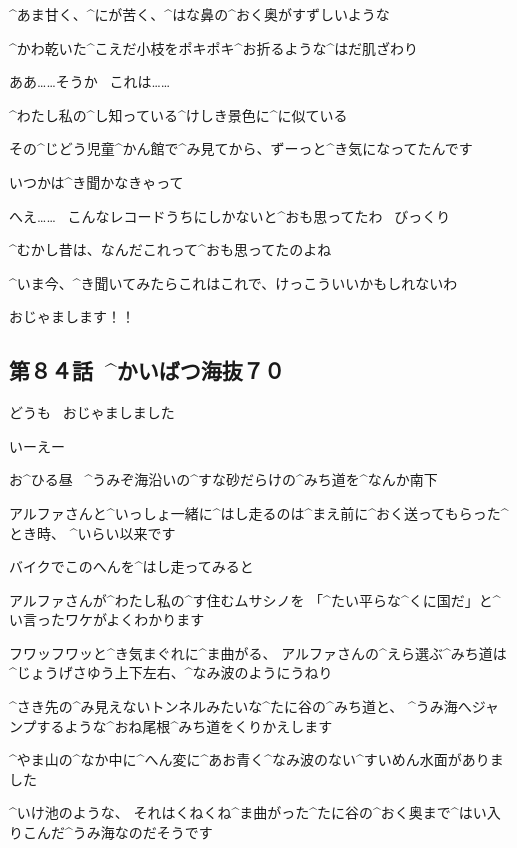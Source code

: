 \Kokone ^{あま}{甘}く、^{にが}{苦}く、^{はな}{鼻}の^{おく}{奥}がすずしいような

\Kokone ^{かわ}{乾}いた^{こえだ}{小枝}をポキポキ^{お}{折}るような^{はだ}{肌}ざわり

\Kokone ああ……そうか
\ これは……

\Kokone ^{わたし}{私}の^{し}{知}っている^{けしき}{景色}に^{に}{似}ている

\page[93]
\Kokone その^{じどう}{児童}^{かん}{館}で^{み}{見}てから、ずーっと^{き}{気}になってたんです

\Kokone いつかは^{き}{聞}かなきゃって

\Sensei へえ……
\ こんなレコードうちにしかないと^{おも}{思}ってたわ
\ びっくり

\Sensei ^{むかし}{昔}は、なんだこれって^{おも}{思}ってたのよね

\Sensei ^{いま}{今}、^{き}{聞}いてみたらこれはこれで、けっこういいかもしれないわ

\page
\Alpha おじゃまします！！


\subsection{第８４話\ ^{かいばつ}{海抜}７０}

\page[96]
\Kokone どうも
\ おじゃましました

\Sensei いーえー

\page
\Kokone お^{ひる}{昼}
\ ^{うみぞ}{海沿}いの^{すな}{砂}だらけの^{みち}{道}を^{なんか}{南下}

\Kokone アルファさんと^{いっしょ}{一緒}に^{はし}{走}るのは^{まえ}{前}に^{おく}{送}ってもらった^{とき}{時}、
^{いらい}{以来}です

\page
\Kokone バイクでこのへんを^{はし}{走}ってみると

\Kokone アルファさんが^{わたし}{私}の^{す}{住}むムサシノを
「^{たい}{平}らな^{くに}{国}だ」と^{い}{言}ったワケがよくわかります

\page
\Kokone フワッフワッと^{き}{気}まぐれに^{ま}{曲}がる、
アルファさんの^{えら}{選}ぶ^{みち}{道}は^{じょうげさゆう}{上下左右}、^{なみ}{波}のようにうねり

\Kokone ^{さき}{先}の^{み}{見}えないトンネルみたいな^{たに}{谷}の^{みち}{道}と、
^{うみ}{海}へジャンプするような^{おね}{尾根}^{みち}{道}をくりかえします

\page
\Kokone ^{やま}{山}の^{なか}{中}に^{へん}{変}に^{あお}{青}く^{なみ}{波}のない^{すいめん}{水面}がありました

\Kokone ^{いけ}{池}のような、
それはくねくね^{ま}{曲}がった^{たに}{谷}の^{おく}{奥}まで^{はい}{入}りこんだ^{うみ}{海}なのだそうです

